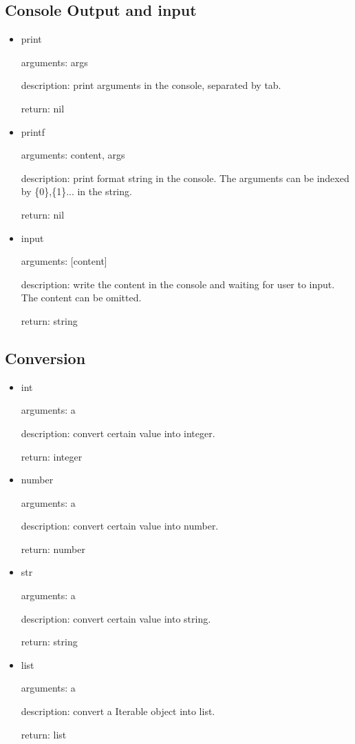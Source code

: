 \documentclass[]{article}
\begin{document}
\subsection{Console Output and input}

\begin{itemize}
	\item print
	
		arguments: args
		
		description: print arguments in the console, separated by tab.
		
		return: nil
	\item printf
	
	arguments: content, args
	
	description: print format string in the console. The arguments can be indexed by \{0\},\{1\}... in the string.
	
	return: nil
	\item input
	
	arguments: [content]
		
	description: write the content in the console and waiting for user to input. The content can be omitted.
		
	return: string
\end{itemize}


\subsection{Conversion}
\begin{itemize}
	\item int

		arguments: a

		description: convert certain value into integer.

		return: integer
	\item number

		arguments: a

		description: convert certain value into number.

		return: number
	\item str

		arguments: a

		description: convert certain value into string.

		return: string
	\item list

		arguments: a

		description: convert a Iterable object into list.

		return: list
\end{itemize}
\end{document}
